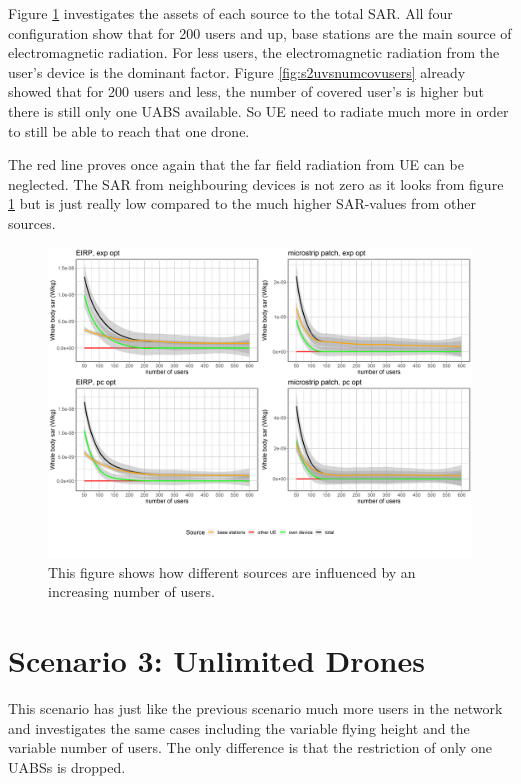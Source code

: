 Figure \ref{fig:s2fourSourcesMatrix} investigates the assets of each source to the total \gls{SAR}. All four 
configuration show that for 200 users and up, base stations are the main source of electromagnetic radiation.
For less users, the electromagnetic radiation from the user's device is the dominant factor. Figure \ref{fig:s2uvsnumcovusers} already 
showed that for 200 users and less, the number of covered user's is higher  but there is still only one \gls{UABS} available.
So \gls{UE}  need to radiate much more in order to still be able to reach that one drone.

The red line proves once again that the far field radiation from \gls{UE} can be neglected. The \gls{SAR} from 
neighbouring devices is not zero as it looks from figure \ref{fig:s2fourSourcesMatrix} but is just really low compared to the much higher
\gls{SAR}-values from other sources.

\begin{figure}[h!]
  \includegraphics[width=\textwidth]{../results/s2/uFourSources.png}
  \caption{This figure shows how different sources are influenced by an increasing number of users. }
  \label{fig:s2fourSourcesMatrix}
\end{figure}

\section{Scenario 3: Unlimited Drones}
\label{s3}

This scenario has just like the previous scenario much more users in the network 
and investigates the same cases including the variable flying height and the variable number of  users.
The only difference is that the restriction of only one \gls{UABS}s is dropped.

